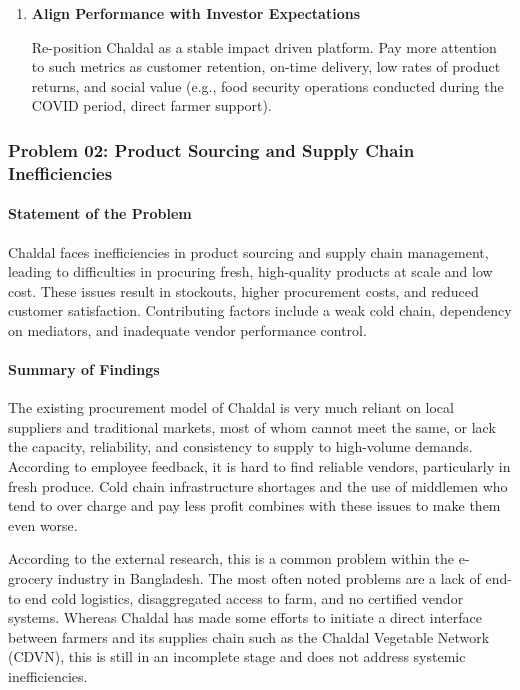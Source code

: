 \documentclass[12pt,a4paper]{article}
\begin{document}
\begin{enumerate}
    Repeat and go outside Dhaka again but with a lean format: One black store, one small fleet, and a local vendor base. Make feasibility test prior to full-scale rollout. The most important areas are highly populated areas, well-penetrated by the internet, and few direct competitors.
    
    \item \textbf{Align Performance with Investor Expectations}
    
    Re-position Chaldal as a stable impact driven platform. Pay more attention to such metrics as customer retention, on-time delivery, low rates of product returns, and social value (e.g., food security operations conducted during the COVID period, direct farmer support).
\end{enumerate}

\subsubsection{Problem 02: Product Sourcing and Supply Chain Inefficiencies}

\paragraph{Statement of the Problem}

Chaldal faces inefficiencies in product sourcing and supply chain management, leading to difficulties in procuring fresh, high-quality products at scale and low cost. These issues result in stockouts, higher procurement costs, and reduced customer satisfaction. Contributing factors include a weak cold chain, dependency on mediators, and inadequate vendor performance control.


\paragraph{Summary of Findings}

The existing procurement model of Chaldal is very much reliant on local suppliers and traditional markets, most of whom cannot meet the same, or lack the capacity, reliability, and consistency to supply to high-volume demands. According to employee feedback, it is hard to find reliable vendors, particularly in fresh produce. Cold chain infrastructure shortages and the use of middlemen who tend to over charge and pay less profit combines with these issues to make them even worse.

According to the external research, this is a common problem within the e-grocery industry in Bangladesh. The most often noted problems are a lack of end-to end cold logistics, disaggregated access to farm, and no certified vendor systems. Whereas Chaldal has made some efforts to initiate a direct interface between farmers and its supplies chain such as the Chaldal Vegetable Network (CDVN), this is still in an incomplete stage and does not address systemic inefficiencies.
\end{document}
